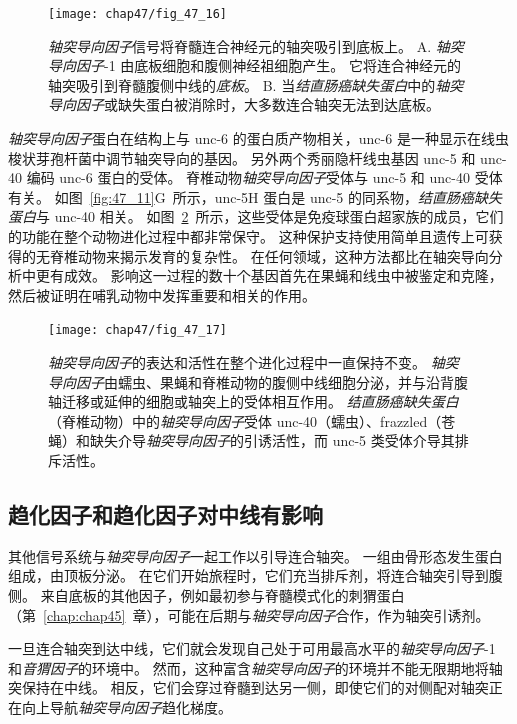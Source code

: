 \begin{figure}[htbp]
	\centering
	\texttt{[image: chap47/fig\_47\_16]}
	\caption{\textit{轴突导向因子}信号将脊髓连合神经元的轴突吸引到底板上。
		A. \textit{轴突导向因子}-1 由底板细胞和腹侧神经祖细胞产生。
		它将连合神经元的轴突吸引到脊髓腹侧中线的\textit{底板}。
		B. 当\textit{结直肠癌缺失蛋白}中的\textit{轴突导向因子}或缺失蛋白被消除时，大多数连合轴突无法到达底板。}
	\label{fig:47_16}
\end{figure}


\textit{轴突导向因子}蛋白在结构上与 unc-6 的蛋白质产物相关，unc-6 是一种显示在线虫梭状芽孢杆菌中调节轴突导向的基因。
另外两个秀丽隐杆线虫基因 unc-5 和 unc-40 编码 unc-6 蛋白的受体。
脊椎动物\textit{轴突导向因子}受体与 unc-5 和 unc-40 受体有关。
如图~\ref{fig:47_11}G~所示，unc-5H 蛋白是 unc-5 的同系物，\textit{结直肠癌缺失蛋白}与 unc-40 相关。
如图~\ref{fig:47_17}~所示，这些受体是免疫球蛋白超家族的成员，它们的功能在整个动物进化过程中都非常保守。
这种保护支持使用简单且遗传上可获得的无脊椎动物来揭示发育的复杂性。
在任何领域，这种方法都比在轴突导向分析中更有成效。
影响这一过程的数十个基因首先在果蝇和线虫中被鉴定和克隆，然后被证明在哺乳动物中发挥重要和相关的作用。


\begin{figure}[htbp]
	\centering
	\texttt{[image: chap47/fig\_47\_17]}
	\caption{\textit{轴突导向因子}的表达和活性在整个进化过程中一直保持不变。
		\textit{轴突导向因子}由蠕虫、果蝇和脊椎动物的腹侧中线细胞分泌，并与沿背腹轴迁移或延伸的细胞或轴突上的受体相互作用。
		\textit{结直肠癌缺失蛋白}（脊椎动物）中的\textit{轴突导向因子}受体 unc-40（蠕虫）、frazzled（苍蝇）和缺失介导\textit{轴突导向因子}的引诱活性，而 unc-5 类受体介导其排斥活性。}
	\label{fig:47_17}
\end{figure}



\subsection{趋化因子和趋化因子对中线有影响}

其他信号系统与\textit{轴突导向因子}一起工作以引导连合轴突。
一组由骨形态发生蛋白组成，由顶板分泌。
在它们开始旅程时，它们充当排斥剂，将连合轴突引导到腹侧。
来自底板的其他因子，例如最初参与脊髓模式化的刺猬蛋白（第~\ref{chap:chap45}~章），可能在后期与\textit{轴突导向因子}合作，作为轴突引诱剂。


一旦连合轴突到达中线，它们就会发现自己处于可用最高水平的\textit{轴突导向因子}-1 和\textit{音猬因子}的环境中。
然而，这种富含\textit{轴突导向因子}的环境并不能无限期地将轴突保持在中线。
相反，它们会穿过脊髓到达另一侧，即使它们的对侧配对轴突正在向上导航\textit{轴突导向因子}趋化梯度。


